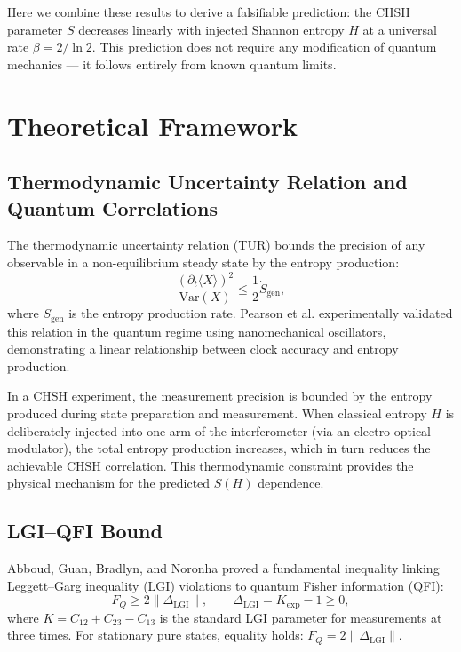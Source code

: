 \documentclass[a4paper]{quantumarticle}
\begin{document}
Here we combine these results to derive a falsifiable prediction: the CHSH parameter $S$ decreases linearly with injected Shannon entropy $H$ at a universal rate $\beta = 2/\ln 2$. This prediction does not require any modification of quantum mechanics --- it follows entirely from known quantum limits.

\section{Theoretical Framework}

\subsection{Thermodynamic Uncertainty Relation and Quantum Correlations}

The thermodynamic uncertainty relation (TUR) \cite{barato2015thermodynamic, gingrich2016dissipation} bounds the precision of any observable in a non-equilibrium steady state by the entropy production:
\[
\frac{(\partial_t \langle X \rangle)^2}{\text{Var}(X)} \leq \frac{1}{2} \dot{S}_{\text{gen}},
\]
where $\dot{S}_{\text{gen}}$ is the entropy production rate. Pearson et al. \cite{pearson2021thermodynamic} experimentally validated this relation in the quantum regime using nanomechanical oscillators, demonstrating a linear relationship between clock accuracy and entropy production.

In a CHSH experiment, the measurement precision is bounded by the entropy produced during state preparation and measurement. When classical entropy $H$ is deliberately injected into one arm of the interferometer (via an electro-optical modulator), the total entropy production increases, which in turn reduces the achievable CHSH correlation. This thermodynamic constraint provides the physical mechanism for the predicted $S(H)$ dependence.

\subsection{LGI--QFI Bound}

Abboud, Guan, Bradlyn, and Noronha \cite{abboud2026lgi} proved a fundamental inequality linking Leggett--Garg inequality (LGI) violations to quantum Fisher information (QFI):
\[
F_Q \geq 2 \| \Delta_{\text{LGI}} \|, \qquad \Delta_{\text{LGI}} = K_{\text{exp}} - 1 \geq 0,
\]
where $K = C_{12} + C_{23} - C_{13}$ is the standard LGI parameter for measurements at three times. For stationary pure states, equality holds: $F_Q = 2 \| \Delta_{\text{LGI}} \|$.
\end{document}
